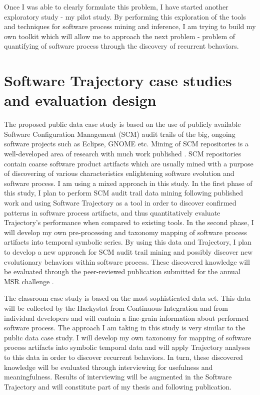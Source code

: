 Once I was able to clearly formulate this problem, I have started another exploratory study - my pilot study. By performing this exploration of the tools and techniques for software process mining and inference, I am trying to build my own toolkit which will allow me to approach the next problem - problem of quantifying of software process through the discovery of recurrent behaviors. 

\section{Software Trajectory case studies and evaluation design}
The proposed public data case study is based on the use of publicly available Software Configuration Management (SCM) audit trails of the big, ongoing software projects such as Eclipse, GNOME etc. Mining of SCM repositories is a well-developed area of research with much work published \cite{citeulike:5043676}. SCM repositories contain coarse software product artifacts which are usually mined with a purpose of discovering of various characteristics enlightening software evolution and software process. I am using a mixed approach in this study. In the first phase of this study, I plan to perform SCM audit trail data mining following published work and using Software Trajectory as a tool in order to discover confirmed patterns in software process artifacts, and thus quantitatively evaluate Trajectory's performance when compared to existing tools. In the second phase, I will develop my own pre-processing and taxonomy mapping of software process artifacts into temporal symbolic series. By using this data and Trajectory, I plan to develop a new approach for SCM audit trail mining and possibly discover new evolutionary behaviors within software process. These discovered knowledge will be evaluated through the peer-reviewed publication submitted for the annual MSR challenge \cite{citeulike:5043676}.

The classroom case study is based on the most sophisticated data set. This data will be collected by the Hackystat from Continuous Integration and from individual developers and will contain a fine-grain information about performed software process. The approach I am taking in this study is very similar to the public data case study. I will develop my own taxonomy for mapping of software process artifacts into symbolic temporal data and will apply Trajectory analyses to this data in order to discover recurrent behaviors. In turn, these discovered knowledge will be evaluated through interviewing for usefulness and meaningfulness. Results of interviewing will be augmented in the Software Trajectory and will constitute part of my thesis and following publication.

